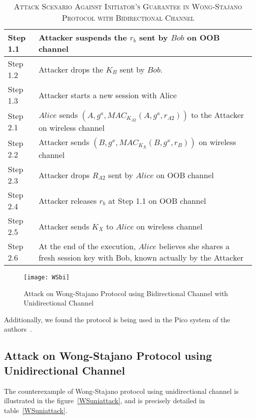 \begin{table}[t]
\centering
\caption{\textsc{Attack Scenario Against Initiator's Guarantee in Wong-Stajano Protocol with Bidirectional Channel}}
\label{WSbiattacktable}
{\small
\begin{tabular}{| l | p{11cm} |}
 \hline
 Step 1.1 & Attacker suspends the $r_b$ sent by $Bob$ on OOB channel\\ \hline
 Step 1.2 & Attacker drops the $K_B$ sent by $Bob$. \\ \hline
 Step 1.3 & Attacker starts a new session with Alice\\ \hline \hline
 Step 2.1 & $Alice$ sends $(A, g^{a}, MAC_{K_{A2}}(A,g^{a},r_{A2}))$ to the Attacker on wireless channel\\ \hline
 Step 2.2 & Attacker sends $(B, g^{x}, MAC_{K_X}(B,g^{x},r_{B}))$ on wireless channel\\ \hline
 Step 2.3 & Attacker drops $R_{A2}$ sent by $Alice$ on OOB channel\\ \hline
 Step 2.4 & Attacker releases $r_b$ at Step 1.1 on OOB channel \\ \hline
 Step 2.5 & Attacker sends $K_X$ to $Alice$ on wireless channel\\ \hline
 Step 2.6 & At the end of the execution, $Alice$ believes she shares a fresh session key with Bob, known actually by the Attacker\\ \hline
\end{tabular}
}
\end{table}

\begin{figure}
  \centering
  \texttt{[image: WSbi]}
  \caption{Attack on Wong-Stajano Protocol using Bidirectional Channel with Unidirectional Channel}
  \label{WSbiattack}
\end{figure}

Additionally, we found the protocol is being used in the Pico system of the authors~\cite{Stajano:2014aa}. 
 
\subsection{Attack on Wong-Stajano Protocol using Unidirectional Channel}

The counterexample of Wong-Stajano protocol using unidirectional channel is illustrated in the figure~\ref{WSuniattack}, and is precisely detailed in table~\ref{WSuniattack}. 

